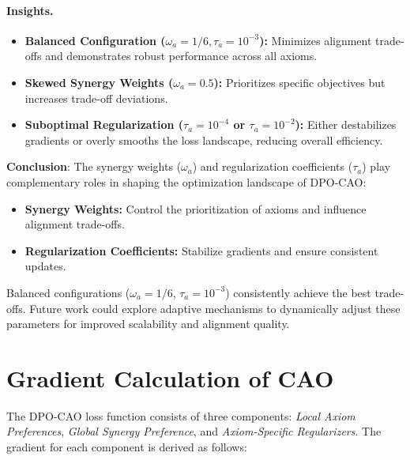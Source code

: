 \paragraph{Insights.}
\begin{itemize}
    \item \textbf{Balanced Configuration (\( \omega_a = 1/6, \tau_a = 10^{-3} \)):} Minimizes alignment trade-offs and demonstrates robust performance across all axioms.
    \item \textbf{Skewed Synergy Weights (\( \omega_a = 0.5 \)):} Prioritizes specific objectives but increases trade-off deviations.
    \item \textbf{Suboptimal Regularization (\( \tau_a = 10^{-4} \) or \( \tau_a = 10^{-2} \)):} Either destabilizes gradients or overly smooths the loss landscape, reducing overall efficiency.
\end{itemize}

\textbf{Conclusion}: The synergy weights (\( \omega_a \)) and regularization coefficients (\( \tau_a \)) play complementary roles in shaping the optimization landscape of DPO-CAO:
\begin{itemize}
    \item \textbf{Synergy Weights:} Control the prioritization of axioms and influence alignment trade-offs.
    \item \textbf{Regularization Coefficients:} Stabilize gradients and ensure consistent updates.
\end{itemize}

Balanced configurations (\( \omega_a = 1/6 \), \( \tau_a = 10^{-3} \)) consistently achieve the best trade-offs. Future work could explore adaptive mechanisms to dynamically adjust these parameters for improved scalability and alignment quality.




\section{Gradient Calculation of CAO}
\label{sec:appendix_gradient}

The DPO-CAO loss function consists of three components: \textit{Local Axiom Preferences}, \textit{Global Synergy Preference}, and \textit{Axiom-Specific Regularizers}. The gradient for each component is derived as follows:

